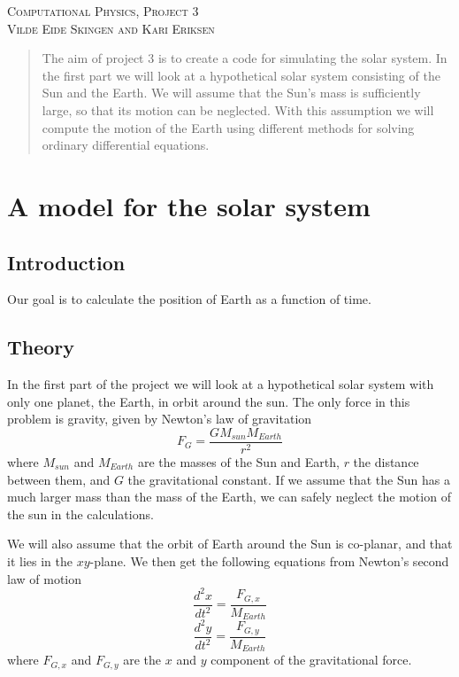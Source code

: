 \documentclass[a4paper,12pt, english]{article}
\begin{document}
\begin{titlepage}
\begin{center}
\textsc{\Large Computational Physics, Project 3}\\[0.5cm]
\textsc{Vilde Eide Skingen and Kari Eriksen}\\[0.5cm]

\end{center}
\end{titlepage}

\begin{abstract}
The aim of project 3 is to create a code for simulating the solar system. In the first part we will look at a hypothetical solar system consisting of the Sun and the Earth. We will assume that the Sun's mass is sufficiently large, so that its motion can be neglected. With this assumption we will compute the motion of the Earth using different methods for solving ordinary differential equations.  
\end{abstract}

\section{A model for the solar system}

\subsection{Introduction}
Our goal is to calculate the position of Earth as a function of time.
\subsection{Theory}
In the first part of the project we will look at a hypothetical solar system with only one planet, the Earth, in orbit around the sun. The only force in this problem is gravity, given by Newton's law of gravitation $$ F_G = \frac{GM_{sun}M_{Earth}}{r^2} $$
where $M_{sun}$ and $M_{Earth}$ are the masses of the Sun and Earth, $r$ the distance between them, and $G$ the gravitational constant. If we assume that the Sun has a much larger mass than the mass of the Earth, we can safely neglect the motion of the sun in the calculations. 

We will also assume that the orbit of Earth around the Sun is co-planar, and that it lies in the $xy$-plane. We  then get the following equations from Newton's second law of motion
$$\frac{d^2x}{dt^2} = \frac{F_{G,x}}{M_{Earth}}$$
$$\frac{d^2y}{dt^2} = \frac{F_{G,y}}{M_{Earth}}$$
where $F_{G,x}$ and $F_{G,y}$ are the $x$ and $y$ component of the gravitational force. 
\end{document}

